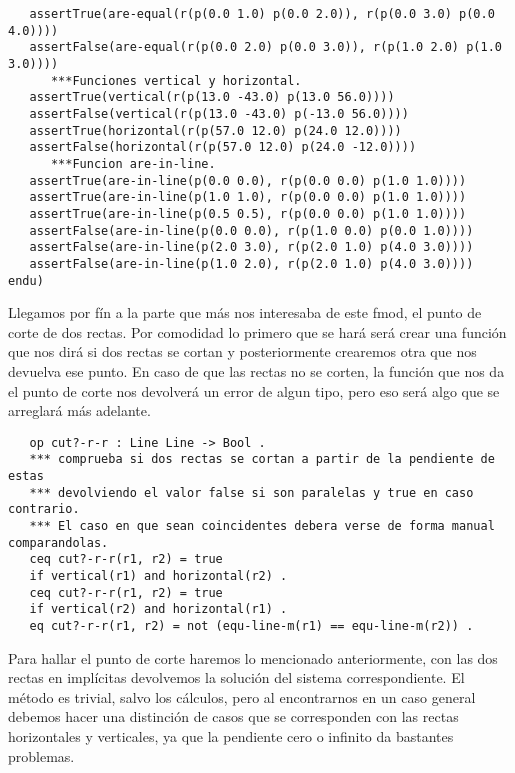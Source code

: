 {\begin{verbatim}
   assertTrue(are-equal(r(p(0.0 1.0) p(0.0 2.0)), r(p(0.0 3.0) p(0.0 4.0))))
   assertFalse(are-equal(r(p(0.0 2.0) p(0.0 3.0)), r(p(1.0 2.0) p(1.0 3.0))))
      ***Funciones vertical y horizontal.
   assertTrue(vertical(r(p(13.0 -43.0) p(13.0 56.0))))
   assertFalse(vertical(r(p(13.0 -43.0) p(-13.0 56.0))))
   assertTrue(horizontal(r(p(57.0 12.0) p(24.0 12.0))))
   assertFalse(horizontal(r(p(57.0 12.0) p(24.0 -12.0))))
      ***Funcion are-in-line.
   assertTrue(are-in-line(p(0.0 0.0), r(p(0.0 0.0) p(1.0 1.0))))
   assertTrue(are-in-line(p(1.0 1.0), r(p(0.0 0.0) p(1.0 1.0))))
   assertTrue(are-in-line(p(0.5 0.5), r(p(0.0 0.0) p(1.0 1.0))))
   assertFalse(are-in-line(p(0.0 0.0), r(p(1.0 0.0) p(0.0 1.0))))
   assertFalse(are-in-line(p(2.0 3.0), r(p(2.0 1.0) p(4.0 3.0))))
   assertFalse(are-in-line(p(1.0 2.0), r(p(2.0 1.0) p(4.0 3.0))))
endu)
\end{verbatim}
}

Llegamos por fín a la parte que más nos interesaba de este fmod, el punto de corte de dos rectas.
Por comodidad lo primero que se hará será crear una función que nos dirá si dos rectas se cortan y
posteriormente crearemos otra que nos devuelva ese punto. En caso de que las rectas no se corten, la función que nos da el punto de corte nos devolverá un error de algun tipo, pero eso será algo que se arreglará más adelante. \par

{\codesize
\begin{verbatim}	
   op cut?-r-r : Line Line -> Bool .
   *** comprueba si dos rectas se cortan a partir de la pendiente de estas
   *** devolviendo el valor false si son paralelas y true en caso contrario.
   *** El caso en que sean coincidentes debera verse de forma manual comparandolas.
   ceq cut?-r-r(r1, r2) = true 
   if vertical(r1) and horizontal(r2) .
   ceq cut?-r-r(r1, r2) = true 
   if vertical(r2) and horizontal(r1) .
   eq cut?-r-r(r1, r2) = not (equ-line-m(r1) == equ-line-m(r2)) .
\end{verbatim}
}

Para hallar el punto de corte haremos lo mencionado anteriormente, con las dos rectas en implícitas devolvemos la solución del sistema correspondiente. El método es trivial, salvo los cálculos, pero al encontrarnos en un caso general debemos hacer una distinción de casos que se corresponden con las rectas horizontales y verticales, ya que la pendiente cero o infinito da bastantes problemas. \par

